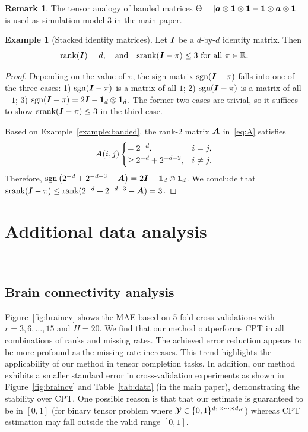 \documentclass[11pt]{article}
\theoremstyle{plain}
\theoremstyle{definition}
\newtheorem{example}{Example}[section]
\newtheorem{rmk}{Remark}[section]
\def\sign{\textup{sgn}}
\def\srank{\textup{srank}}
\def\rank{\textup{rank}}
\begin{document}
\begin{rmk} The tensor analogy of banded matrices $\Theta=|\bm{a}\otimes\mathbf{1}\otimes \mathbf{1}-\mathbf{1}\otimes\bm{a}\otimes \mathbf{1}|$ is used as simulation model 3 in the main paper.  
\end{rmk}

\begin{example}[Stacked identity matrices]
Let $\bm I$ be a $d$-by-$d$ identity matrix. Then
\[
\rank(\mI)=d,\quad\text{and}\quad  \srank(\mI-\pi)\leq 3 \ \text{for all }\pi\in\mathbb{R}.
\]
\end{example}
\begin{proof}
Depending on the value of $\pi$, the sign matrix $\sign(\mI-\pi)$ falls into one of the three cases: 1) $\sign(\mI-\pi)$ is a matrix of all $1$; 2) $\sign(\mI-\pi)$ is a matrix of all $-1$; 3) $\sign(\mI-\pi)=2\mI-\mathbf{1}_d\otimes \mathbf{1}_d$. The former two cases are trivial, so it suffices to show $\srank(\mI-\pi)\leq 3$ in the third case.   


Based on Example~\ref{example:banded}, the rank-2 matrix $\bm A$ in~\eqref{eq:A} satisfies 
\[
\bm A(i,j)
\begin{cases}
=2^{-d}, & i=j,\\
\geq 2^{-d}+2^{-d-2}, & i\neq j.
\end{cases}
\]
Therefore, $\sign\left(2^{-d}+2^{-d-3}-\mA\right)=2\mI-\mathbf{1}_d\otimes \mathbf{1}_d$. We conclude that $\srank(\mI-\pi)\leq \rank(2^{-d}+2^{-d-3}-\mA)=3$. 
\end{proof}


\section{Additional data analysis}~\label{sec:data}
\vspace{-1cm}
\subsection{Brain connectivity analysis}
Figure~\ref{fig:braincv} shows the MAE based on 5-fold cross-validations with $r = 3,6,\ldots, 15$ and $H = 20$. We find that our method outperforms CPT in all combinations of ranks and missing rates. The achieved error reduction appears to be more profound as the missing rate increases. This trend highlights the applicability of our method in tensor completion tasks. In addition, our method exhibits a smaller standard error in cross-validation experiments as shown in Figure~\ref{fig:braincv} and Table~\ref{tab:data} (in the main paper), demonstrating the stability over CPT.  One possible reason is that that our estimate is guaranteed to be in $[0,1]$ (for binary tensor problem where $\mathcal{Y}\in\{0,1\}^{d_1\times\cdots\times d_K}$) whereas CPT estimation may fall outside the valid range $[0,1]$. 
\end{document}

